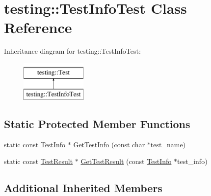 \hypertarget{classtesting_1_1_test_info_test}{\section{testing\-:\-:Test\-Info\-Test Class Reference}
\label{classtesting_1_1_test_info_test}
}
Inheritance diagram for testing\-:\-:Test\-Info\-Test\-:\begin{figure}[H]
\begin{center}
\leavevmode
\includegraphics[height=2.000000cm]{classtesting_1_1_test_info_test}
\end{center}
\end{figure}
\subsection*{Static Protected Member Functions}
\begin{DoxyCompactItemize}
\item 
static const \hyperlink{classtesting_1_1_test_info}{Test\-Info} $\ast$ \hyperlink{classtesting_1_1_test_info_test_a4140c1302bf53c7f1375a23923624f04}{Get\-Test\-Info} (const char $\ast$test\-\_\-name)
\item 
static const \hyperlink{classtesting_1_1_test_result}{Test\-Result} $\ast$ \hyperlink{classtesting_1_1_test_info_test_a154b3679b1aa00ad037ce46eb60d18c3}{Get\-Test\-Result} (const \hyperlink{classtesting_1_1_test_info}{Test\-Info} $\ast$test\-\_\-info)
\end{DoxyCompactItemize}
\subsection*{Additional Inherited Members}


